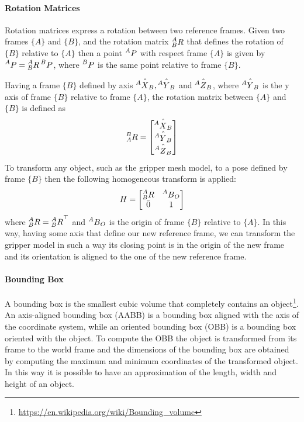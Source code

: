 \paragraph{Rotation Matrices}
Rotation matrices  express a rotation between two reference frames. Given two frames $\{A\}$ and $\{B\}$, and the rotation matrix $\prescript{A}{B}R$ that defines the rotation of $\{B\}$ relative to $\{A\}$ then a point $\prescript{A}{}P$ with respect frame $\{A\}$ is given by $\prescript{A}{}P=\prescript{A}{B}R\prescript{B}{}P$, where $\prescript{B}{}P$ is the same point relative to frame $\{B\}$. 

Having a frame $\{B\}$ defined by axis $\hat{\prescript{A}{}X_B},\hat{\prescript{A}{}Y_B}$ and $\hat{\prescript{A}{}Z_B}$, where $\hat{\prescript{A}{}Y_B}$ is the y axis of frame $\{B\}$ relative to frame $\{A\}$, the rotation matrix between $\{A\}$ and $\{B\}$ is defined as
\[
\prescript{B}{A}R = 
\begin{bmatrix}
\hat{\prescript{A}{}X_B} \\
\hat{\prescript{A}{}Y_B} \\
\hat{\prescript{A}{}Z_B} \\
\end{bmatrix}
\]
To transform any object, such as the gripper mesh model, to a pose defined by frame $\{B\}$ then the following homogeneous transform is applied:
\[
H = 
\begin{bmatrix}
\prescript{A}{B}R & \prescript{A}{}B_O \\
\bar{0} & 1
\end{bmatrix}
\]
where  $\prescript{A}{B}R={\prescript{A}{B}R}^{\top}$ and $\prescript{A}{}B_O$ is the origin of frame $\{B\}$ relative to $\{A\}$. In this way, having some axis that define our new reference frame, we can transform the gripper model in such a way its closing point is in the origin of the new frame and its orientation is aligned to the one of the new reference frame. 

\paragraph{Bounding Box}
A bounding box is the smallest cubic volume that completely contains an object\footnote{\href{https://en.wikipedia.org/wiki/Bounding_volume}{\url{https://en.wikipedia.org/wiki/Bounding\_volume}}}.
An axis-aligned bounding box (AABB) is a bounding box aligned with the axis of the coordinate system, while an oriented bounding box (OBB) is a bounding box oriented with the object. To compute the OBB the object is transformed from its frame to the world frame and the dimensions of the bounding box are obtained by computing the maximum and minimum coordinates of the transformed object. In this way it is possible to have an approximation of the length, width and height of an object.


